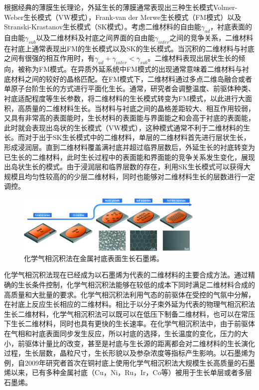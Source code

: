     根据经典的薄膜生长理论，外延生长的薄膜通常表现出三种生长模式\chinesecolon Volmer-Weber生长模式（VW模式），Frank-van der Merwe生长模式（FM模式）以及Stranski-Krastanov生长模式（SK模式）。考虑二维材料的自由能$\gamma_{ad}$，衬底表面的自由能$\gamma_{sub}$以及二维材料及衬底之间界面的自由能$\gamma_{inter}$之间的竞争关系，二维材料在衬底上通常表现出FM的生长模式以及SK的生长模式。当沉积的二维材料与衬底之间有很强的相互作用时，有$\gamma_{ad}+\gamma_{inter}<\gamma_{sub}$。二维材料表现出层状生长的倾向，被称为FM模式。在异质外延系统中FM模式的出现通常意味着二维材料与衬底材料之间的较好的晶格匹配。在FM模式下，二维材料通过多点二维岛融合或者单原子台阶生长的方式进行平面化生长。通常，研究者会调整温度、前驱体种类、衬底适配程度等生长参数，将二维材料的生长模式转变为FM模式，以此进行大面积，高质量的二维材料生长。当材料与衬底之间的晶格差距较大、相互作用较弱，又具有非常高的表面能时，生长材料的表面能与界面能之和会高于衬底的表面能，此时就会表现出岛状的生长模式（VW模式），这种模式通常不利于二维材料的生长。而对于出于SK生长模式中的二维材料，单层的二维材料首先进行层状生长，形成浸润层。直到二维材料覆盖满衬底并超过临界层数后，外延生长的衬底转变为已生长的二维材料，此时生长过程中的表面能和界面能的竞争关系发生变化，展现出岛状生长的模式。由于浸润层和临界层数的存在，利用SK生长模式可以获得大规模且均匀性较高的的少层二维材料，同时也能够对二维材料生长的层数进行一定调控。

    \begin{figure}[htb]
        \includegraphics[width=0.8\textwidth]{pic/INTRO_CVD_graphene_growth.png}
        \caption{化学气相沉积法在金属衬底表面生长石墨烯。}
        \label{}
    \end{figure}

    化学气相沉积法现在已经成为以石墨烯为代表的二维材料的主要合成方法。通过精确的生长条件控制，化学气相沉积法能够在较低的成本下同时满足二维材料合成的高质量和大批量的要求。化学气相沉积法利用气态的前驱体在受控的气氛中分解，在衬底上反应生长相应的二维材料。相比于以分子束外延为代表的物理气相沉积法生长二维材料，化学气相沉积法可以既可以在低压下制备二维材料，也可以在常压下生长二维材料，同时也具有更快的生长速率。在化学气相沉积法中，由于前驱体在气相和衬底表面同步发生反应，所以衬底的选择，生长温度的变化，压力的大小，前驱体计量比的改变，甚至是衬底与生长源的距离都会对二维材料的生长演化过程，生长层数，晶粒尺寸，生长形貌以及参杂浓度等指标产生影响。以石墨烯为例，自2009年研究者首次在铜衬底上使用化学气相沉积法大规模生长高质量的石墨烯以来，已有多种金属衬底（Cu，Ni，Ru，Ir，Co等）被用于生长单层或者多层石墨烯。

